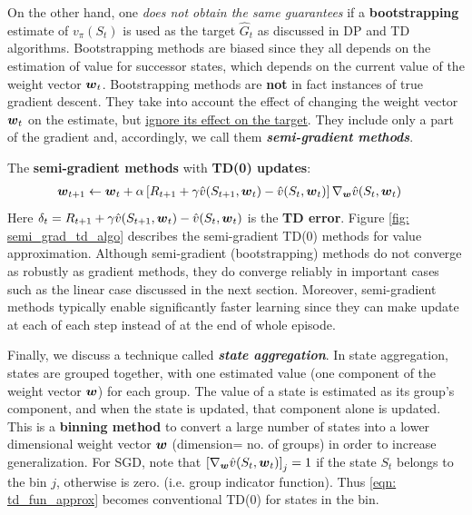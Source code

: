 \documentclass[11pt]{article}
\begin{document}
On the other hand, one \emph{does not obtain the same guarantees} if a \textbf{bootstrapping} estimate of $v_{\pi}(S_{t})$  is used as the target $\hat{G}_{t}$ as discussed in DP and TD algorithms. Bootstrapping methods are biased since they all depends on the estimation of value for successor states, which depends on the current value of the weight vector $\boldsymbol{w}_{t}$. Bootstrapping methods are \textbf{not} in fact instances of true gradient descent. They take into account the effect of changing the weight vector  $\boldsymbol{w}_{t}$ on the estimate, but \underline{ignore its effect on the target}. They include only a part of the gradient and, accordingly, we call them \emph{\textbf{semi-gradient methods}}. 

The \textbf{semi-gradient methods} with \textbf{TD(0) updates}:
\begin{align}
\boldsymbol{w}_{t+1} &\leftarrow  \boldsymbol{w}_{t} + \alpha \left[R_{t+1} + \gamma \hat{v}(S_{t+1}, \boldsymbol{w}_{t}) - \hat{v}(S_{t}, \boldsymbol{w}_{t})\right] \nabla_{\boldsymbol{w}}{\hat{v}(S_{t}, \boldsymbol{w}_{t})} \label{eqn: td_fun_approx}
\end{align} Here $\delta_{t} = R_{t+1} + \gamma \hat{v}(S_{t+1}, \boldsymbol{w}_{t}) - \hat{v}(S_{t}, \boldsymbol{w}_{t})$ is the \textbf{TD error}. Figure \ref{fig: semi_grad_td_algo} describes the semi-gradient TD(0) methods for value approximation. Although semi-gradient (bootstrapping) methods do not converge as robustly as gradient methods, they do converge reliably in important cases such as the linear case discussed in the next section. Moreover, semi-gradient methods typically enable significantly faster learning since they can make update at each of each step instead of at the end of whole episode. 

Finally, we discuss a technique called \textbf{\emph{state aggregation}}. In state aggregation,  states are grouped together, with one estimated value (one component of the weight vector $\boldsymbol{w}$) for each group. The value of a state is estimated as its group’s component, and when the state is updated, that component alone is updated. This is a \textbf{binning method} to convert a large number of states into a lower dimensional weight vector $\boldsymbol{w}$ (dimension= no. of groups) in order to increase generalization. For SGD, note that $\left[\nabla_{\boldsymbol{w}}{\hat{v}(S_{t}, \boldsymbol{w}_{t})}\right]_{j} = 1$ if the state $S_{t}$ belongs to the bin $j$, otherwise is zero. (i.e. group indicator function). Thus \eqref{eqn: td_fun_approx} becomes conventional TD(0) for states in the bin.
\end{document}
